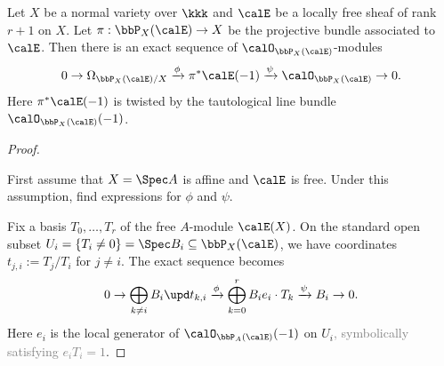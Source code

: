     \begin{theorem}\label{thm:Euler_sequence_for_projective_bundle}
        Let \(X\) be a normal variety over \(\kkk\) and \(\calE\) be a locally free sheaf of rank \(r+1\) on \(X\).
        Let \(\pi: \bbP_X(\calE) \to X\) be the projective bundle associated to \(\calE\).
        Then there is an exact sequence of \(\calO_{\bbP_X(\calE)}\)-modules
        \[
            0 \to \Omega_{\bbP_X(\calE)/X} \xrightarrow{\phi} \pi^*\calE(-1) \xrightarrow{\psi} \calO_{\bbP_X(\calE)} \to 0.
        \]
        Here \(\pi^*\calE(-1)\) is twisted by the tautological line bundle \(\calO_{\bbP_X(\calE)}(-1)\).
    \end{theorem}
    \begin{proof}
        \hspace{1em}
        \begin{step}\label{step_in_Euler_sequence:affine_base_to_find_phi_psi}
            First assume that \(X = \Spec A\) is affine and \(\calE\) is free.
            Under this assumption, find expressions for \(\phi\) and \(\psi\).
        \end{step}
        
        Fix a basis \(T_0, \ldots, T_r\) of the free \(A\)-module \(\calE(X)\).
        On the standard open subset \(U_i = \{T_i \neq 0\} = \Spec B_i \subseteq \bbP_X(\calE)\), we have coordinates \(t_{j,i} := T_j/T_i\) for \(j \neq i\).
        The exact sequence becomes
        \[ 
            0 \to \bigoplus_{k \neq i} B_i \upd t_{k,i} \xrightarrow{\phi} \bigoplus_{k=0}^r B_i e_i \cdot T_k \xrightarrow{\psi} B_i \to 0.
        \]
        Here \(e_i\) is the local generator of \(\calO_{\bbP_A(\calE)}(-1)\) on \(U_i\)\textcolor{gray}{, symbolically satisfying \(e_i T_i = 1\)}.


\end{proof}
